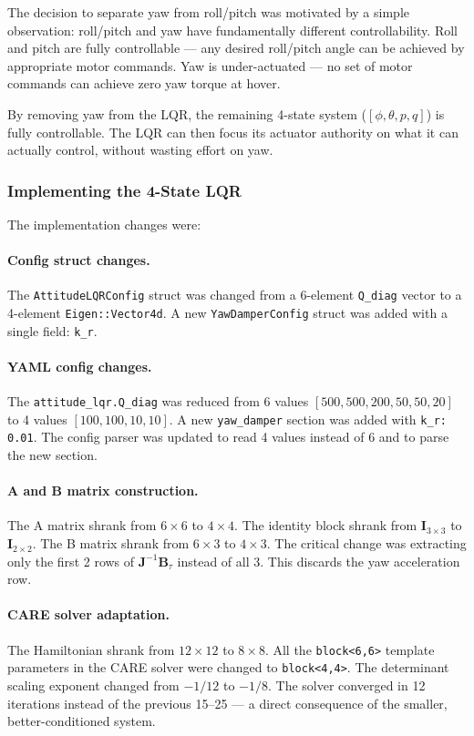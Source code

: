 \documentclass[12pt, a4paper]{article}
\newcommand{\bJ}{\bm{J}}
\newcommand{\bB}{\bm{B}}
\newcommand{\bI}{\bm{I}}
\begin{document}
The decision to separate yaw from roll/pitch was motivated by a simple observation: roll/pitch and yaw have fundamentally different controllability.  Roll and pitch are fully controllable --- any desired roll/pitch angle can be achieved by appropriate motor commands.  Yaw is under-actuated --- no set of motor commands can achieve zero yaw torque at hover.

By removing yaw from the LQR, the remaining 4-state system ($[\phi, \theta, p, q]$) is fully controllable.  The LQR can then focus its actuator authority on what it can actually control, without wasting effort on yaw.

\subsubsection{Implementing the 4-State LQR}

The implementation changes were:

\paragraph{Config struct changes.}  The \texttt{AttitudeLQRConfig} struct was changed from a 6-element \texttt{Q\_diag} vector to a 4-element \texttt{Eigen::Vector4d}.  A new \texttt{YawDamperConfig} struct was added with a single field: \texttt{k\_r}.

\paragraph{YAML config changes.}  The \texttt{attitude\_lqr.Q\_diag} was reduced from 6 values $[500, 500, 200, 50, 50, 20]$ to 4 values $[100, 100, 10, 10]$.  A new \texttt{yaw\_damper} section was added with \texttt{k\_r: 0.01}.  The config parser was updated to read 4 values instead of 6 and to parse the new section.

\paragraph{A and B matrix construction.}  The A matrix shrank from $6 \times 6$ to $4 \times 4$.  The identity block shrank from $\bI_{3 \times 3}$ to $\bI_{2 \times 2}$.  The B matrix shrank from $6 \times 3$ to $4 \times 3$.  The critical change was extracting only the first 2 rows of $\bJ^{-1} \bB_\tau$ instead of all 3.  This discards the yaw acceleration row.

\paragraph{CARE solver adaptation.}  The Hamiltonian shrank from $12 \times 12$ to $8 \times 8$.  All the \texttt{block<6,6>} template parameters in the CARE solver were changed to \texttt{block<4,4>}.  The determinant scaling exponent changed from $-1/12$ to $-1/8$.  The solver converged in 12 iterations instead of the previous 15--25 --- a direct consequence of the smaller, better-conditioned system.
\end{document}
